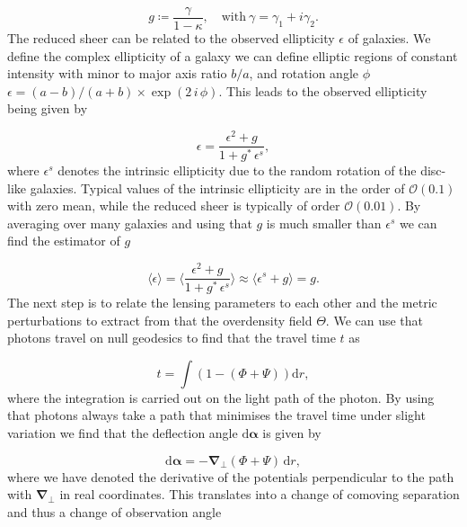 \documentclass[oneside]{book}
\newcommand*{\rd}{\mathrm{d}}
\begin{document}
\begin{equation}
    g \coloneqq \frac{\gamma}{1-\kappa},\quad \text{with}\: \gamma = \gamma_1 + i \gamma_2.
\end{equation} 
The reduced sheer can be related to the observed ellipticity $\epsilon$ of galaxies. We define the complex ellipticity of a galaxy we can define elliptic regions of constant intensity with minor to major axis ratio $b/a$, and rotation angle $\phi$ $\epsilon=(a-b)/(a+b)\times \exp(2\,i\,\phi)$. This leads to the observed ellipticity being given by 

\begin{equation}
    \epsilon = \frac{\epsilon^2+g}{1+g^*\,\epsilon^s},
\end{equation}
where $\epsilon^s$ denotes the intrinsic ellipticity due to the random rotation of the disc-like galaxies. Typical values of the intrinsic ellipticity are in the order of $\mathcal{O}(0.1)$ with zero mean, while the reduced sheer is typically of order $\mathcal{O}(0.01)$. By averaging over many galaxies and using that $g$ is much smaller than $\epsilon^s$ we can find the estimator of $g$ 

\begin{equation}
    \label{eq:lesning_estimator}
    \langle \epsilon \rangle=\langle \frac{\epsilon^2+g}{1+g^*\,\epsilon^s} \rangle \approx \langle \epsilon^s+g\rangle = g.
\end{equation}
The next step is to relate the lensing parameters to each other and the metric perturbations to extract from that the overdensity field $\varTheta$.  
We can use that photons travel on null geodesics to find that the travel time $t$ as

\begin{equation*}
    t = \int (1-(\Phi+\Psi)) \rd r,
\end{equation*}
where the integration is carried out on the light path of the photon. By using that photons always take a path that minimises the travel time under slight variation we find that the deflection angle $\rd \boldsymbol{\alpha}$ is given by 

\begin{equation}
    \label{eq:deflectionangle}
    \rd \boldsymbol{\alpha} = - \boldsymbol{\nabla}_\perp (\Phi+\Psi)\, \rd r,
\end{equation}  
where we have denoted the derivative of the potentials perpendicular to the path with $\boldsymbol{\nabla}_\perp$ in real coordinates. This translates into a change of comoving separation and thus a change of observation angle 
\end{document}
